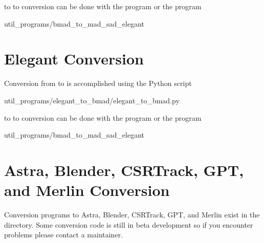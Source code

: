 \bmad to  to conversion can be done with the \tao program or the program 
\begin{example}
  util_programs/bmad_to_mad_sad_elegant
\end{example}

\section{Elegant Conversion}
\label{s:elegant.convert}

Conversion from \cite{b:elegant} to \bmad is accomplished using the Python script
\begin{example}
  util_programs/elegant_to_bmad/elegant_to_bmad.py
\end{example}

\bmad to  to conversion can be done with the \tao program or the program 
\begin{example}
  util_programs/bmad_to_mad_sad_elegant
\end{example}

\section{Astra, Blender, CSRTrack, GPT, and Merlin Conversion}
\label{s:other.convert}

Conversion programs to Astra, Blender, CSRTrack, GPT, and Merlin exist in the 
directory. Some conversion code is still in beta development so if you encounter
problems please contact a \bmad maintainer. 
